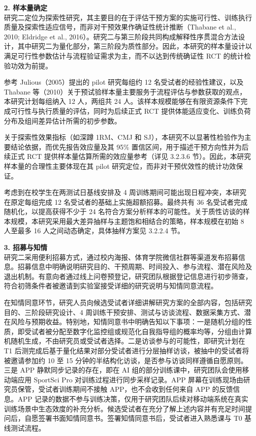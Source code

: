 \documentclass[UTF8,zihao=-4,twoside,openany]{ctexbook}
\begin{document}
\vspace{0.2cm}
\noindent \textbf{2. 样本量确定} \\
研究二定位为探索性研究，其主要目的在于评估干预方案的实施可行性、训练执行质量及探索性适应信号，而非对干预效果作确证性统计推断（Thabane et al., 2010; Eldridge et al., 2016）。研究二与第三阶段共同构成解释性序贯混合方法设计，其中研究二为量化部分，第三阶段为质性部分。因此，本研究的样本量设计以满足可行性参数估计与流程验证需求为主，而不以达到传统确证性 RCT 的统计检验功效为前提。

参考 Julious（2005）提出的 pilot 研究每组约 12 名受试者的经验性建议，以及 Thabane 等（2010）关于预试验样本量主要服务于流程评估与参数获取的观点，本研究计划每组纳入 12 人，两组共 24 人。该样本规模能够在有限资源条件下完成可行性与执行质量的评估，同时为后续正式 RCT 提供体能适应变化、训练负荷分布及组间差异估计所需的初步参数。

关于探索性效果指标（如深蹲 1RM、CMJ 和 SJ），本研究不以显著性检验作为主要结论依据，而优先报告效应量及其 95\% 置信区间，用于描述干预方向性并为后续正式 RCT 提供样本量估算所需的效应量参考（详见 3.2.3.6 节）。因此，本研究样本量的合理性主要体现在其 pilot 研究定位，而非对干预优效性的统计功效保证。

考虑到在校学生在两测试日基线安排及 4 周训练期间可能出现日程冲突，本研究在原定每组完成 12 名受试者的基础上实施超额招募。最终共有 36 名受试者完成随机化，以提高获得不少于 24 名符合方案分析样本的可能性。关于质性访谈的样本规模，本研究采用最大差异抽样与主题饱和相结合的策略，样本规模在初始 8 人至最多 16 人之间动态确定，具体抽样方案见 3.2.2.4 节。

\vspace{0.2cm}
\noindent \textbf{3. 招募与知情} \\
研究二采用便利招募方式，通过校内海报、体育学院微信社群等渠道发布招募信息。招募信息中明确说明研究目的、干预周期、时间投入、参与流程、潜在风险及退出机制。有意向者通过线上问卷预登记，研究团队根据登记信息进行初步筛查，符合初筛条件者被邀请到实验室接受详细的研究说明与知情同意流程。

在知情同意环节，研究人员向候选受试者详细讲解研究方案的全部内容，包括研究目的、三阶段研究设计、4 周训练干预安排、测试与访谈流程、数据采集方式、潜在风险与预期收益。特别地，知情同意书中明确告知以下事项：一是随机分组的性质，即受试者被分配至数字化监控组或规范化自我指导组的概率均等，分组由计算机随机生成，不由研究员或受试者选择。二是访谈参与的可能性，即研究计划在 T1 后测完成后基于量化结果对部分受试者进行分层抽样访谈，被抽中的受试者将被邀请参加约 10 至 15 分钟的半结构化访谈，是否参与访谈同样遵循自愿原则。三是 APP 静默同步记录的存在，即在 AI 组的部分训练课中，研究团队会使用移动端应用 SportSci Pro 对训练过程进行同步采样记录。APP 屏幕在训练现场由研究员保管，受试者训练期间不接触 APP，也不会收到任何来自 APP 的反馈信息。APP 记录的数据不参与训练决策，仅用于研究团队后续对移动端系统在真实训练场景中生态效度的补充分析。候选受试者在充分了解上述内容并有充足时间提问后，自愿签署书面知情同意书。签署知情同意书后，受试者进入熟悉课与 T0 基线测试流程。
\end{document}
